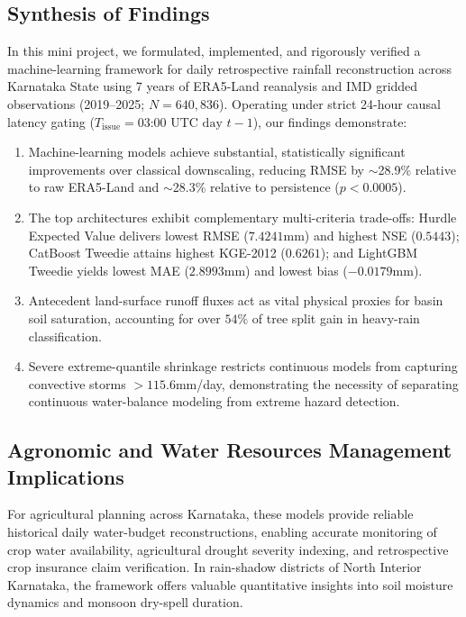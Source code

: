 \documentclass[12pt]{article}
\begin{document}
\subsection{Synthesis of Findings}
In this mini project, we formulated, implemented, and rigorously verified a machine-learning framework for daily retrospective rainfall reconstruction across Karnataka State using 7 years of ERA5-Land reanalysis and IMD gridded observations (2019--2025; $N = 640,836$). Operating under strict 24-hour causal latency gating ($T_{\text{issue}} = \text{03:00 UTC day } t-1$), our findings demonstrate:
\begin{enumerate}
    \item Machine-learning models achieve substantial, statistically significant improvements over classical downscaling, reducing RMSE by $\sim$28.9\% relative to raw ERA5-Land and $\sim$28.3\% relative to persistence ($p < 0.0005$).
    \item The top architectures exhibit complementary multi-criteria trade-offs: Hurdle Expected Value delivers lowest RMSE ($7.4241$\;mm) and highest NSE ($0.5443$); CatBoost Tweedie attains highest KGE-2012 ($0.6261$); and LightGBM Tweedie yields lowest MAE ($2.8993$\;mm) and lowest bias ($-0.0179$\;mm).
    \item Antecedent land-surface runoff fluxes act as vital physical proxies for basin soil saturation, accounting for over $54\%$ of tree split gain in heavy-rain classification.
    \item Severe extreme-quantile shrinkage restricts continuous models from capturing convective storms $>115.6$\;mm/day, demonstrating the necessity of separating continuous water-balance modeling from extreme hazard detection.
\end{enumerate}

\subsection{Agronomic and Water Resources Management Implications}
For agricultural planning across Karnataka, these models provide reliable historical daily water-budget reconstructions, enabling accurate monitoring of crop water availability, agricultural drought severity indexing, and retrospective crop insurance claim verification. In rain-shadow districts of North Interior Karnataka, the framework offers valuable quantitative insights into soil moisture dynamics and monsoon dry-spell duration.
\end{document}
